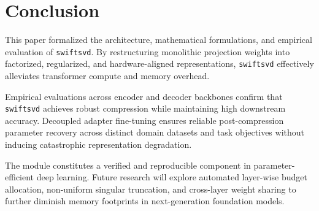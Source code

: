 \section{Conclusion}
This paper formalized the architecture, mathematical formulations, and empirical evaluation of \texttt{swiftsvd}. By restructuring monolithic projection weights into factorized, regularized, and hardware-aligned representations, \texttt{swiftsvd} effectively alleviates transformer compute and memory overhead.

Empirical evaluations across encoder and decoder backbones confirm that \texttt{swiftsvd} achieves robust compression while maintaining high downstream accuracy. Decoupled adapter fine-tuning ensures reliable post-compression parameter recovery across distinct domain datasets and task objectives without inducing catastrophic representation degradation.

The module constitutes a verified and reproducible component in parameter-efficient deep learning. Future research will explore automated layer-wise budget allocation, non-uniform singular truncation, and cross-layer weight sharing to further diminish memory footprints in next-generation foundation models.
